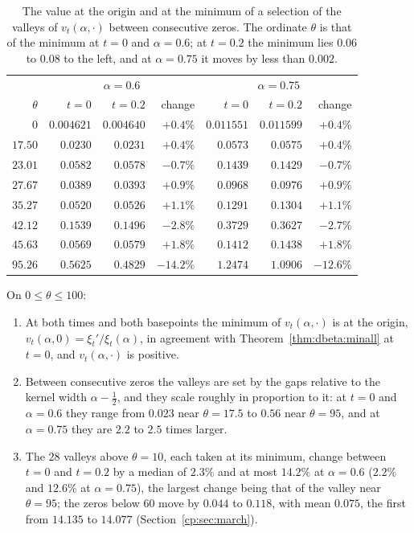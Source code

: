 \begin{table}[ht]
\centering\small
\begin{tabular}{@{}rrrrrrr@{}}
\toprule
 & \multicolumn{3}{c}{$\alpha=0.6$} & \multicolumn{3}{c}{$\alpha=0.75$}\\
$\theta$ & $t=0$ & $t=0.2$ & change & $t=0$ & $t=0.2$ & change\\
\midrule
$0$ & $0.004621$ & $0.004640$ & $+0.4\%$ & $0.011551$ & $0.011599$ & $+0.4\%$\\
$17.50$ & $0.0230$ & $0.0231$ & $+0.4\%$ & $0.0573$ & $0.0575$ & $+0.4\%$\\
$23.01$ & $0.0582$ & $0.0578$ & $-0.7\%$ & $0.1439$ & $0.1429$ & $-0.7\%$\\
$27.67$ & $0.0389$ & $0.0393$ & $+0.9\%$ & $0.0968$ & $0.0976$ & $+0.9\%$\\
$35.27$ & $0.0520$ & $0.0526$ & $+1.1\%$ & $0.1291$ & $0.1304$ & $+1.1\%$\\
$42.12$ & $0.1539$ & $0.1496$ & $-2.8\%$ & $0.3729$ & $0.3627$ & $-2.7\%$\\
$45.63$ & $0.0569$ & $0.0579$ & $+1.8\%$ & $0.1412$ & $0.1438$ & $+1.8\%$\\
$95.26$ & $0.5625$ & $0.4829$ & $-14.2\%$ & $1.2474$ & $1.0906$ & $-12.6\%$\\
\bottomrule
\end{tabular}
\caption{The value at the origin and at the minimum of a selection of the valleys of $v_t(\alpha,\cdot)$ between consecutive zeros. The ordinate $\theta$ is that of the minimum at $t=0$ and $\alpha=0.6$; at $t=0.2$ the minimum lies $0.06$ to $0.08$ to the left, and at $\alpha=0.75$ it moves by less than $0.002$.}
\label{cp:tab:valleys}
\end{table}

\begin{proposition}[Computed]\label{cp:prop:see}
On $0\le\theta\le100$:
\begin{enumerate}
\item[(i)] At both times and both basepoints the minimum of $v_t(\alpha,\cdot)$ is at the origin, $v_t(\alpha,0)=\xi_t'/\xi_t(\alpha)$, in agreement with Theorem~\ref{thm:dbeta:minall} at $t=0$, and $v_t(\alpha,\cdot)$ is positive.
\item[(ii)] Between consecutive zeros the valleys are set by the gaps relative to the kernel width $\alpha-\frac12$, and they scale roughly in proportion to it: at $t=0$ and $\alpha=0.6$ they range from $0.023$ near $\theta=17.5$ to $0.56$ near $\theta=95$, and at $\alpha=0.75$ they are $2.2$ to $2.5$ times larger.
\item[(iii)] The $28$ valleys above $\theta=10$, each taken at its minimum, change between $t=0$ and $t=0.2$ by a median of $2.3\%$ and at most $14.2\%$ at $\alpha=0.6$ ($2.2\%$ and $12.6\%$ at $\alpha=0.75$), the largest change being that of the valley near $\theta=95$; the zeros below $60$ move by $0.044$ to $0.118$, with mean $0.075$, the first from $14.135$ to $14.077$ (Section~\ref{cp:sec:march}).
\end{enumerate}
\end{proposition}

